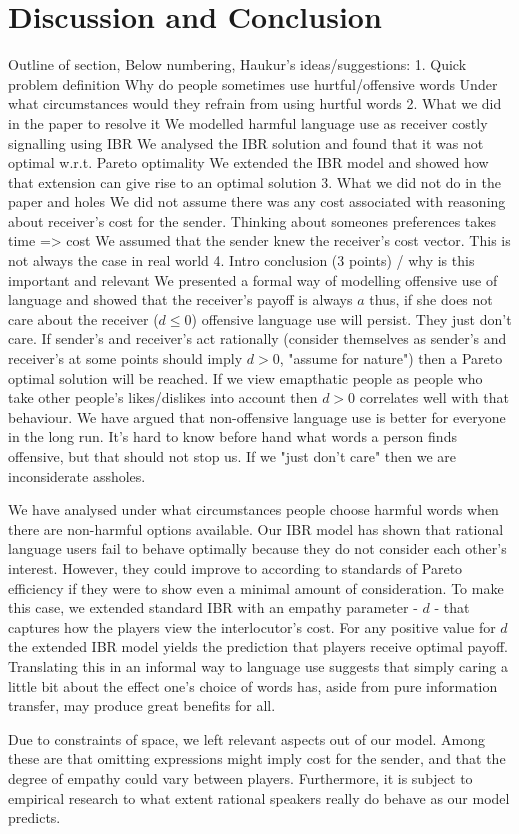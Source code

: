 \documentclass[10pt,a4paper]{article}
\begin{document}
\section{Discussion and Conclusion}
\label{section5}
Outline of section, Below numbering, Haukur's ideas/suggestions:
1. Quick problem definition
Why do people sometimes use hurtful/offensive words
Under what circumstances would they refrain from using hurtful words
2. What we did in the paper to resolve it
We modelled harmful language use as receiver costly signalling using IBR
We analysed the IBR solution and found that it was not optimal w.r.t. Pareto optimality
We extended the IBR model and showed how that extension can give rise to an optimal solution
3. What we did not do in the paper and holes
We did not assume there was any cost associated with reasoning about receiver's cost for the sender. Thinking about someones preferences takes time => cost
We assumed that the sender knew the receiver's cost vector. This is not always the case in real world
4. Intro conclusion (3 points) / why is this important and relevant
We presented a formal way of modelling offensive use of language and showed that the receiver's payoff is always $a$ thus, if she does not care about the receiver ($d\leq 0$) offensive language use will persist. They just don't care.
If sender's and receiver's act rationally (consider themselves as sender's and receiver's at some points should imply $d > 0$, "assume for nature") then a Pareto optimal solution will be reached.
If we view emapthatic people as people who take other people's likes/dislikes into account then $d>0$ correlates well with that behaviour.
We have argued that non-offensive language use is better for everyone in the long run.
It's hard to know before hand what words a person finds offensive, but that should not stop us. If we "just don't care" then we are inconsiderate assholes.

We have analysed under what circumstances people choose harmful words when there are non-harmful options available.
Our IBR model has shown that rational language users fail to behave optimally because they do not consider each other's interest. However, they could improve to according to standards of Pareto efficiency if they were to show even a minimal amount of consideration. To make this case, we extended standard IBR with an empathy parameter - $d$ - that captures how the players view the interlocutor's cost. For any positive value for $d$ the extended IBR model yields the prediction that players receive optimal payoff. Translating this in an informal way to language use suggests that simply caring a little bit about the effect one's choice of words has, aside from pure information transfer, may produce great benefits for all.

Due to constraints of space, we left relevant aspects out of our model. Among these are that omitting expressions might imply cost for the sender, and that the degree of empathy could vary between players. Furthermore, it is subject to empirical research to what extent rational speakers really do behave as our model predicts.



\end{document}
